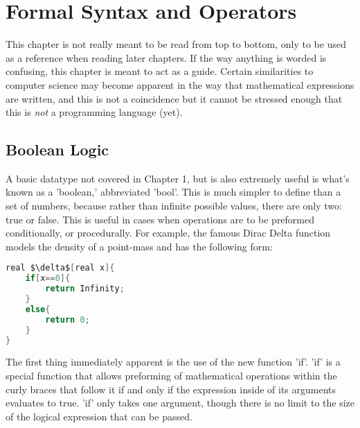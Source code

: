 \chapter{Formal Syntax and Operators}
This chapter is not really meant to be read from top to bottom, only to be used as a reference when reading later chapters. If the way anything is worded is confusing, this chapter is meant to act as a guide. Certain similarities to computer science may become apparent in the way that mathematical expressions are written, and this is not a coincidence but it cannot be stressed enough that this is \emph{not} a programming language (yet).

\section{Boolean Logic}
A basic datatype not covered in Chapter 1, but is also extremely useful is what's known as a 'boolean,' abbreviated 'bool'. This is much simpler to define than a set of numbers, because rather than infinite possible values, there are only two: true or false. This is useful in cases when operations are to be preformed conditionally, or procedurally. For example, the famous Dirac Delta function models the density of a point-mass and has the following form:
\begin{lstlisting}[language=C,caption=Dirac Delta Function,label=lst:dirdelFunc,mathescape]
real $\delta$[real x]{
	if[x==0]{
		return Infinity;
	}
	else{
		return 0;
	}
}
\end{lstlisting}
The first thing immediately apparent is the use of the new function 'if'. 'if' is a special function that allows preforming of mathematical operations within the curly braces that follow it if and only if the expression inside of its arguments evaluates to true. 'if' only takes one argument, though there is no limit to the size of the logical expression that can be passed.
